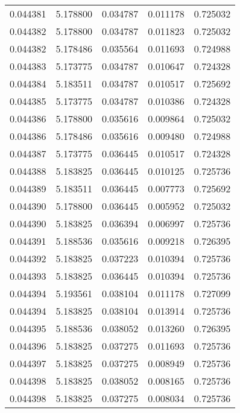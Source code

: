 \begin{tabular}{lrrrr}
0.044381    &  5.178800 &  0.034787 &  0.011178 &             0.725032 \\
0.044382    &  5.178800 &  0.034787 &  0.011823 &             0.725032 \\
0.044382    &  5.178486 &  0.035564 &  0.011693 &             0.724988 \\
0.044383    &  5.173775 &  0.034787 &  0.010647 &             0.724328 \\
0.044384    &  5.183511 &  0.034787 &  0.010517 &             0.725692 \\
0.044385    &  5.173775 &  0.034787 &  0.010386 &             0.724328 \\
0.044386    &  5.178800 &  0.035616 &  0.009864 &             0.725032 \\
0.044386    &  5.178486 &  0.035616 &  0.009480 &             0.724988 \\
0.044387    &  5.173775 &  0.036445 &  0.010517 &             0.724328 \\
0.044388    &  5.183825 &  0.036445 &  0.010125 &             0.725736 \\
0.044389    &  5.183511 &  0.036445 &  0.007773 &             0.725692 \\
0.044390    &  5.178800 &  0.036445 &  0.005952 &             0.725032 \\
0.044390    &  5.183825 &  0.036394 &  0.006997 &             0.725736 \\
0.044391    &  5.188536 &  0.035616 &  0.009218 &             0.726395 \\
0.044392    &  5.183825 &  0.037223 &  0.010394 &             0.725736 \\
0.044393    &  5.183825 &  0.036445 &  0.010394 &             0.725736 \\
0.044394    &  5.193561 &  0.038104 &  0.011178 &             0.727099 \\
0.044394    &  5.183825 &  0.038104 &  0.013914 &             0.725736 \\
0.044395    &  5.188536 &  0.038052 &  0.013260 &             0.726395 \\
0.044396    &  5.183825 &  0.037275 &  0.011693 &             0.725736 \\
0.044397    &  5.183825 &  0.037275 &  0.008949 &             0.725736 \\
0.044398    &  5.183825 &  0.038052 &  0.008165 &             0.725736 \\
0.044398    &  5.183825 &  0.037275 &  0.008034 &             0.725736 \\

\end{tabular}
